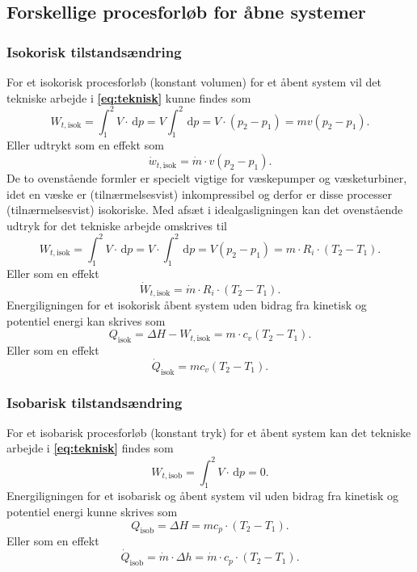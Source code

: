\subsection{Forskellige procesforløb for åbne systemer}

\subsubsection{Isokorisk tilstandsændring}
For et isokorisk procesforløb (konstant volumen) for et åbent system vil det tekniske arbejde i \textbf{\autoref{eq:teknisk}} kunne findes som
\[ 
W_{t, \text{isok}} = \int_{1}^{2} V \cdot \, \mathrm{d}p = V \int_{1}^{2} \, \mathrm{d}p = V \cdot (p_2 - p_1) = mv (p_2 - p_1)
.\]
Eller udtrykt som en effekt som
\[ 
\dot{w}_{t, \text{isok}} = \dot{m} \cdot v \left( p_2 - p_1 \right)
.\]
De to ovenstående formler er specielt vigtige for væskepumper og væsketurbiner, idet en væske er (tilnærmelsesvist) inkompressibel og derfor er disse processer (tilnærmelsesvist) isokoriske. Med afsæt i idealgasligningen kan det ovenstående udtryk for det tekniske arbejde omskrives til
\[ 
W_{t, \text{isok}} = \int_{1}^{2} V \cdot \, \mathrm{d}p = V \cdot \int_{1}^{2} \, \mathrm{d}p = V (p_2 - p_1) = m \cdot R_i \cdot \left( T_2 - T_1 \right)
.\]
Eller som en effekt
\[ 
\dot{W}_{t, \text{isok}} = \dot{m} \cdot R_i \cdot \left( T_2 - T_1 \right)
.\]
Energiligningen for et isokorisk åbent system uden bidrag fra kinetisk og potentiel energi kan skrives som
\[ 
Q_{\text{isok}} = \Delta H - W_{t, \text{isok}} = m \cdot c_v \left( T_2 - T_1 \right)
.\]
Eller som en effekt
\[ 
\dot{Q}_{\text{isok}} = mc_v \left( T_2 - T_1 \right)
.\]

\subsubsection{Isobarisk tilstandsændring}
For et isobarisk procesforløb (konstant tryk) for et åbent system kan det tekniske arbejde i \textbf{\autoref{eq:teknisk}} findes som
\[ 
W_{t, \text{isob}} = \int_{1}^{2} V \cdot \, \mathrm{d}p = 0
.\]
Energiligningen for et isobarisk og åbent system vil uden bidrag fra kinetisk og potentiel energi kunne skrives som
\[ 
Q_{\text{isob}} = \Delta H = mc_p \cdot \left( T_2 - T_1 \right)
.\]
Eller som en effekt
\[ 
\dot{Q}_{\text{isob}} = \dot{m} \cdot \Delta h = \dot{m} \cdot c_p \cdot \left( T_2 - T_1 \right)
.\]

